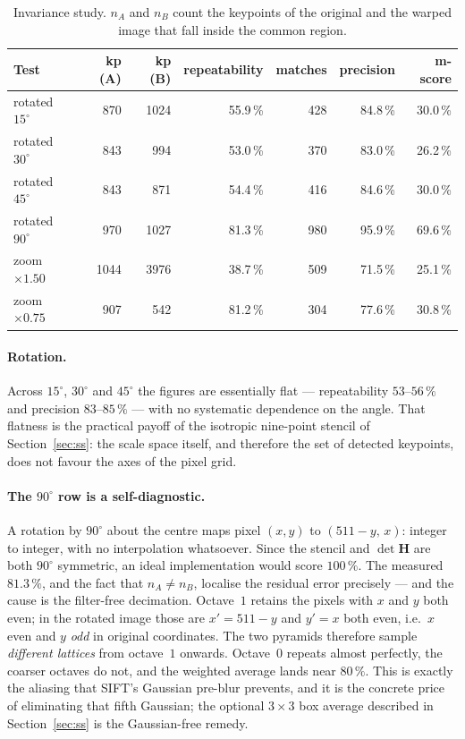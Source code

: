 \begin{table}[ht]
\centering
\small
\begin{tabular}{@{}lrrrrrr@{}}
\toprule
Test & kp (A) & kp (B) & repeatability & matches & precision & m-score \\
\midrule
rotated $15^{\circ}$ &  870 & 1024 & 55.9\,\% & 428 & 84.8\,\% & 30.0\,\% \\
rotated $30^{\circ}$ &  843 &  994 & 53.0\,\% & 370 & 83.0\,\% & 26.2\,\% \\
rotated $45^{\circ}$ &  843 &  871 & 54.4\,\% & 416 & 84.6\,\% & 30.0\,\% \\
rotated $90^{\circ}$ &  970 & 1027 & 81.3\,\% & 980 & 95.9\,\% & 69.6\,\% \\
\addlinespace[2pt]
zoom $\times1.50$    & 1044 & 3976 & 38.7\,\% & 509 & 71.5\,\% & 25.1\,\% \\
zoom $\times0.75$    &  907 &  542 & 81.2\,\% & 304 & 77.6\,\% & 30.8\,\% \\
\bottomrule
\end{tabular}
\caption{Invariance study. $n_A$ and $n_B$ count the keypoints of the original
and the warped image that fall inside the common region.}
\label{tab:bench}
\end{table}

\paragraph{Rotation.} Across $15^{\circ}$, $30^{\circ}$ and $45^{\circ}$ the
figures are essentially flat --- repeatability $53$--$56\,\%$ and precision
$83$--$85\,\%$ --- with no systematic dependence on the angle. That flatness is
the practical payoff of the isotropic nine-point stencil of
Section~\ref{sec:ss}: the scale space itself, and therefore the set of
detected keypoints, does not favour the axes of the pixel grid.

\paragraph{The $90^{\circ}$ row is a self-diagnostic.} A rotation by
$90^{\circ}$ about the centre maps pixel $(x,y)$ to $(511-y,\,x)$: integer to
integer, with no interpolation whatsoever. Since the stencil and
$\det\mathbf{H}$ are both $90^{\circ}$ symmetric, an ideal implementation would
score $100\,\%$. The measured $81.3\,\%$, and the fact that $n_A\neq n_B$,
localise the residual error precisely --- and the cause is the filter-free
decimation. Octave~$1$ retains the pixels with $x$ and $y$ both even; in the
rotated image those are $x'=511-y$ and $y'=x$ both even, i.e.\ $x$ even and $y$
\emph{odd} in original coordinates. The two pyramids therefore sample
\emph{different lattices} from octave~$1$ onwards. Octave~$0$ repeats almost
perfectly, the coarser octaves do not, and the weighted average lands near
$80\,\%$. This is exactly the aliasing that SIFT's Gaussian pre-blur prevents,
and it is the concrete price of eliminating that fifth Gaussian; the optional
$3\times3$ box average described in Section~\ref{sec:ss} is the Gaussian-free
remedy.

